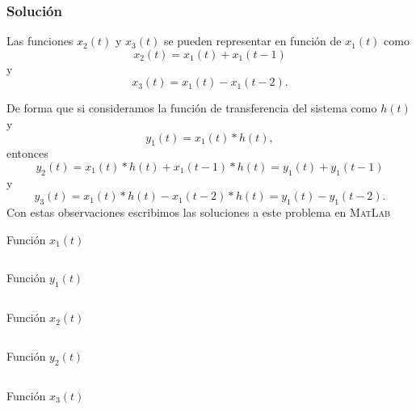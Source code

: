 \documentclass[a4paper,12pt,final]{article}
\begin{document}
    \subsubsection*{Solución}
      \noindent Las funciones $x_2\left(t\right)$ y $x_3\left(t\right)$ se pueden representar en función de $x_1\left(t\right)$ como
      $$x_2\left(t\right) = x_1\left(t\right) + x_1\left(t - 1\right)$$
      \noindent y
      $$x_3\left(t\right) = x_1\left(t\right) - x_1\left(t - 2\right).$$

      De forma que si consideramos la función de transferencia del sistema como $h\left(t\right)$ y
      $$y_1\left(t\right) = x_1\left(t\right) * h\left(t\right),$$
      \noindent entonces
      $$y_2\left(t\right) = x_1\left(t\right) * h\left(t\right) + x_1\left(t - 1\right) * h\left(t\right) = y_1\left(t\right) + y_1\left(t - 1\right)$$
      \noindent y
      $$y_3\left(t\right) = x_1\left(t\right) * h\left(t\right) - x_1\left(t - 2\right) * h\left(t\right) = y_1\left(t\right) - y_1\left(t - 2\right).$$
      \noindent Con estas observaciones escribimos las soluciones a este problema en \textsc{MatLab}

      \begin{listing}[H]
        \caption{Función $x_1\left(t\right)$}
        \label{script02A}
        \inputminted{matlab}{./laboratorio_3/p2_X1.m}
      \end{listing}

      \begin{listing}[H]
        \caption{Función $y_1\left(t\right)$}
        \label{script02B}
        \inputminted{matlab}{./laboratorio_3/p2_Y1.m}
      \end{listing}

      \begin{listing}[H]
        \caption{Función $x_2\left(t\right)$}
        \label{script02C}
        \inputminted{matlab}{./laboratorio_3/p2_X2.m}
      \end{listing}

      \begin{listing}[H]
        \caption{Función $y_2\left(t\right)$}
        \label{script02D}
        \inputminted{matlab}{./laboratorio_3/p2_Y2.m}
      \end{listing}

      \begin{listing}[H]
        \caption{Función $x_3\left(t\right)$}
        \label{script02E}
        \inputminted{matlab}{./laboratorio_3/p2_X3.m}
      \end{listing}
\end{document}
